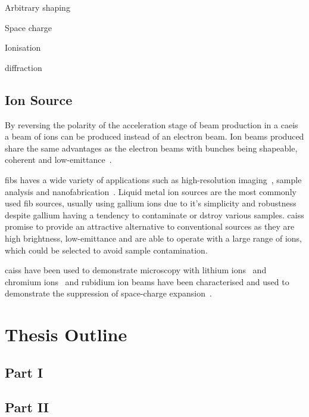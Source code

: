 Arbitrary shaping~\cite{mcculloch_arbitrarily_2011}

Space charge~\cite{murphy_detailed_2014,murphy_increasing_2015,thompson_suppression_2016}

Ionisation~\cite{speirs_identification_2017}

diffraction~\cite{saliba_spatial_2012,speirs_single-shot_2015}


\subsection{Ion Source}

By reversing the polarity of the acceleration stage of beam production in a \gls{caeis} a beam of ions can be produced instead of an electron beam.
Ion beams produced share the same advantages as the electron beams with bunches being shapeable, coherent and low-emittance~\cite{knuffman_cold_2013}.

\Glspl{fib} haves a wide variety of applications such as high-resolution imaging~\cite{scipioni_helium_2008}, sample analysis and nanofabrication~\cite{khizroev_focused-ion-beam-based_2004}.
Liquid metal ion sources are the most commonly used \gls{fib} sources, usually using gallium ions due to it's simplicity and robustness despite gallium having a tendency to contaminate or dstroy various samples.
\Glspl{cais} promise to provide an attractive alternative to conventional sources as they are high brightness, low-emittance and are able to operate with a large range of ions, which could be selected to avoid sample contamination.

\Glspl{cais} have been used to demonstrate microscopy with lithium ions~\cite{knuffman_nanoscale_2011} and chromium ions~\cite{steele_focused_2010} and rubidium ion beams have been characterised and used to demonstrate the suppression of space-charge expansion~\cite{murphy_detailed_2014,thompson_suppression_2016}.

\section{Thesis Outline}

\subsection{Part I}

\subsection{Part II}
